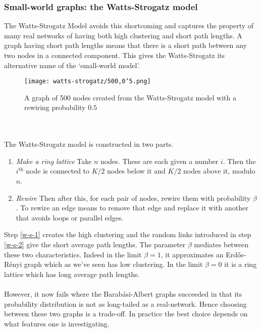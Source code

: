 \subsubsection{Small-world graphs: the Watts-Strogatz model}
The Watts-Strogatz Model avoids this shortcoming and captures the property of many real networks of having both high clustering and short path lengths\cite{watts-strogatz}. A graph having short path lengths means that there is a short path between any two nodes in a connected component. This gives the Watts-Strogatz its alternative name of the `small-world model'.
\begin{figure}
	\centering
	\texttt{[image: watts-strogatz/500,0`5.png]}
	\caption{A graph of 500 nodes created from the Watts-Strogatz model with a rewiring probability $0.5$}
	\label{fig:ba-700}
\end{figure}
\\
\\
The Watts-Strogatz model is constructed in two parts.
\begin{enumerate}[nosep]
	\item\label{w-s-1} \textit{Make a ring lattice} Take $n$ nodes. These are each given a number $i$. Then the $i^{\text{th}}$ node is connected to $K/2$ nodes below it and $K/2$ nodes above it, modulo $n$. 
	\item\label{w-s-2} \textit{Rewire} Then after this, for each pair of nodes, rewire them with probability $\beta$. To rewire an edge means to remove that edge and replace it with another that avoids loops or parallel edges.\\
\end{enumerate}
Step \ref{w-s-1} creates the high clustering and the random links introduced in step \ref{w-s-2} give the short average path lengths. The parameter $\beta$ mediates between these two characteristics. Indeed in the limit $\beta=1$, it approximates an Erd\H{o}s-R{\'e}nyi graph which as we've seen has low clustering. In the limit $\beta=0$ it is a ring lattice which has long average path lengths.\\
\\
However, it now fails where the Barab\'asi-Albert graphs succeeded in that its probability distribution is not as long-tailed as a real-network. Hence choosing between these two graphs is a trade-off. In practice the best choice depends on what features one is investigating.

